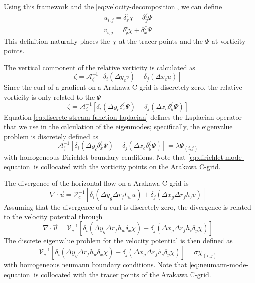 \documentclass[draft]{agujournal2019}
\begin{document}
Using this framework and the \eqref{eq:velocity-decomposition}, we can define
\begin{subequations}
    \begin{align}
        u_{i,j} = \delta_x^c \chi - \delta_y^\zeta \Psi \\
        v_{i,j} = \delta_y^c \chi + \delta_x^\zeta \Psi
    \end{align}
\end{subequations}
This definition naturally places the $\chi$ at the tracer points and the $\Psi$ at vorticity points.

The vertical component of the relative vorticity is calculated as
\begin{equation}
    \zeta = \mathcal{A}_\zeta^{-1} \left[ \delta_i ( \Delta y_c v ) - \delta_j( \Delta x_c u ) \right]
\end{equation}
Since the curl of a gradient on a Arakawa C-grid is discretely zero, the relative vorticity is only related to the $\Psi$
\begin{equation}
    \zeta = \mathcal{A}_\zeta^{-1} \left[ \delta_i ( \Delta y_c \delta_x^\zeta \Psi ) + \delta_j( \Delta x_c \delta_y^\zeta \Psi ) \right] \label{eq:discrete-stream-function-laplacian}
\end{equation}
Equation \eqref{eq:discrete-stream-function-laplacian} defines the Laplacian operator that we use in the calculation of the eigenmodes; specifically, the eigenvalue problem is discretely defined as
\begin{equation}
    \mathcal{A}_\zeta^{-1} \left[ \delta_i ( \Delta y_c \delta_x^\zeta \Psi ) + \delta_j( \Delta x_c \delta_y^\zeta \Psi ) \right] = \lambda \Psi_{(i,j)} \label{eq:dirichlet-mode-equation}
\end{equation}
with homogeneous Dirichlet boundary conditions. Note that \eqref{eq:dirichlet-mode-equation} is collocated with the vorticity points on the Arakawa C-grid. 

The divergence of the horizontal flow on a Arakawa C-grid is
\begin{equation}
    \nabla \cdot \vec{u} = \mathcal{V}_c^{-1}\left[ \delta_i( \Delta y_g \Delta r_f h_w u) + \delta_j( \Delta x_g \Delta r_f h_s v) \right]
\end{equation}
Assuming that the divergence of a curl is discretely zero, the divergence is related to the velocity potential through
\begin{equation}
    \nabla \cdot \vec{u} = \mathcal{V}_c^{-1}\left[ \delta_i( \Delta y_g \Delta r_f h_w \delta_x \chi) + \delta_j( \Delta x_g \Delta r_f h_s \delta_y \chi) \right]
\end{equation}
The discrete eigenvalue problem for the velocity potential is then defined as
\begin{equation}
   \mathcal{V}_c^{-1}\left[ \delta_i( \Delta y_g \Delta r_f h_w \delta_x \chi) + \delta_j( \Delta x_g \Delta r_f h_s \delta_y \chi) \right] = \sigma \chi_{(i,j)} \label{eq:neumann-mode-equation}
\end{equation}
with homogeneous neumann boundary conditions. Note that \eqref{eq:neumann-mode-equation} is collocated with the tracer points of the Arakawa C-grid.
\end{document}
